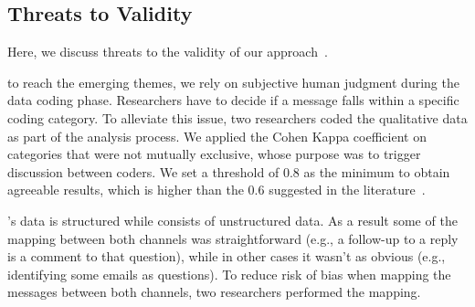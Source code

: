 

\subsection{Threats to Validity}
\label{cha:threats}
Here, we discuss threats to the validity of our approach~\cite{Runeson2012}.

\begin{description}[itemsep=3pt, topsep=2pt, leftmargin=1em, parsep=0pt]

\item[Construct validity:] to reach the emerging themes, we rely on subjective human judgment during the data coding phase. Researchers have to decide if a message falls within a specific coding category. To alleviate this issue, two researchers coded the qualitative data as part of the analysis process. We applied the Cohen Kappa coefficient on categories that were not mutually exclusive, whose purpose was to trigger discussion between coders. We set a threshold of 0.8 as the minimum to obtain agreeable results, which is higher than the 0.6 suggested in the literature~\cite{Landis1977}.

\item[Internal validity:] \SO's data is structured while \RH consists of unstructured data. As a result some of the mapping between both channels was straightforward (e.g., a follow-up to a reply is a comment to that question), while in other cases it wasn't as obvious (e.g., identifying some emails as questions). To reduce risk of bias when mapping the messages between both channels, two researchers performed the mapping.  




\end{description}
